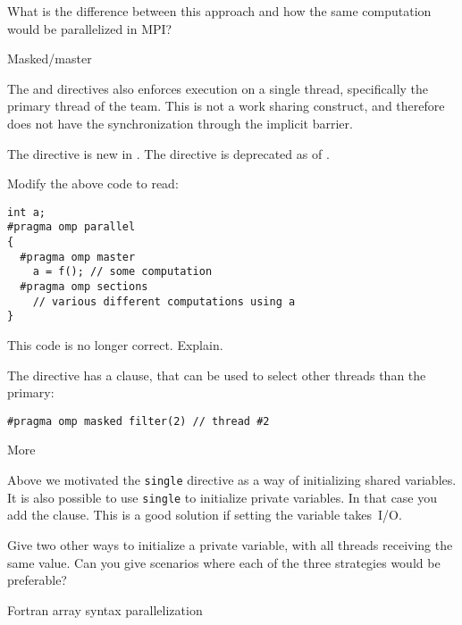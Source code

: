 \begin{exercise}
  \label{ex:omp-single-mpi}
  What is the difference between this approach and how the same
  computation would be parallelized in MPI?
\end{exercise}

 {Masked/master}

The  and  directives
also enforces execution on a single thread,
specifically the primary thread of the team.
This is not a work sharing construct, and therefore
does not have the synchronization through the implicit barrier.

\begin{remark}
  The  directive is new in .
  The  directive is deprecated
  as of .
\end{remark}

\begin{exercise}
  Modify the above code to read:
\begin{lstlisting}[language=omp]
int a;
#pragma omp parallel
{
  #pragma omp master
    a = f(); // some computation
  #pragma omp sections
    // various different computations using a
}
\end{lstlisting}
  This code is no longer correct. Explain.
\end{exercise}

The  directive has a  clause,
that can be used to select other threads than the primary:
\begin{lstlisting}[language=omp]
#pragma omp masked filter(2) // thread #2
\end{lstlisting}

 {More}

Above we motivated the \lstinline[language=omp]{single} directive as a way of initializing
shared variables. It is also possible to use \lstinline[language=omp]{single} to initialize
private variables. In that case you add the 
clause. This is a good solution if setting the variable takes~I/O.

\begin{exercise}
  Give two other ways to initialize a private variable, with all
  threads receiving the same value. Can you give scenarios where each
  of the three strategies would be preferable?
\end{exercise}

 {Fortran array syntax parallelization}
\label{sec:fortran-workshare}

